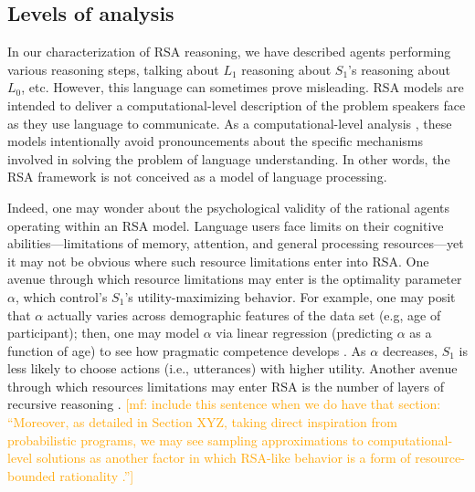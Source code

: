 \documentclass{sp}
\newcommand{\gcs}[1]{\textcolor{blue}{[gcs: #1]}}
\newcommand{\mf}[1]{\textcolor{orange}{[mf: #1]}}
\newcommand{\mht}[1]{\textcolor{purple}{[mht: #1]}}
\begin{document}



\subsection{Levels of analysis}


In our characterization of RSA reasoning, we have described agents performing various reasoning steps, talking about $L_1$ reasoning about $S_1$'s reasoning about $L_0$, etc. However, this language can sometimes prove misleading. RSA models are intended to deliver a computational-level description of the problem speakers face as they use language to communicate. As a computational-level analysis \citep{marr1982}, these models intentionally avoid pronouncements about the specific mechanisms involved in solving the problem of language understanding. In other words, the RSA framework is not conceived as a model of language processing.

Indeed, one may wonder about the psychological validity of the rational agents operating within an RSA model.
Language users face limits on their cognitive abilities---limitations of memory, attention, and general processing resources---yet it may not be obvious where such resource limitations enter into RSA.
One avenue through which resource limitations may enter is the optimality parameter $\alpha$, which control's $S_1$'s utility-maximizing behavior.
For example, one may posit that $\alpha$ actually varies across demographic features of the data set (e.g, age of participant); then, one may model $\alpha$ via linear regression (predicting $\alpha$ as a function of age) to see how pragmatic competence develops \citep{bohn2019predicting}.
As $\alpha$ decreases, $S_1$ is less likely to choose actions (i.e., utterances) with higher utility.
Another avenue through which resources limitations may enter RSA is the number of layers of recursive reasoning \citep{FrankeDegen2015:Reasoning-in-Re}.
\mf{include this sentence when we do have that section: ``Moreover, as detailed in Section XYZ, taking direct inspiration from probabilistic programs, we may see sampling approximations to computational-level solutions as another factor in which RSA-like behavior is a form of resource-bounded rationality \citep{GriffithsLieder2015:Rational-Use-of}.''}
\end{document}
